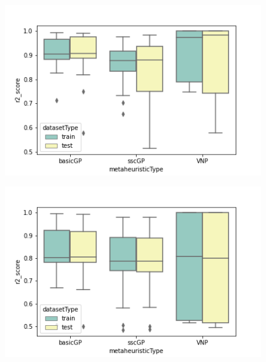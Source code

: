 \documentclass[main.tex]{subfiles}
\begin{document}
\begin{figure}
\centering
\begin{minipage}{.5\textwidth}
  \centering
  \includegraphics[width=1.1\linewidth]{../images/f1.png}
  \label{fig:f1}
\end{minipage}%
\begin{minipage}{.5\textwidth}
  \centering
  \includegraphics[width=1.1\linewidth]{../images/f2.png}
  \label{fig:f2}
\end{minipage}
\end{figure}
\end{document}
